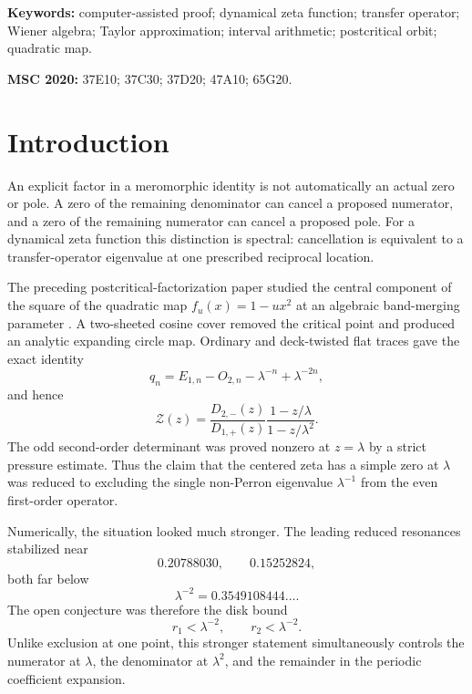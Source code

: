 \documentclass[11pt]{article}
\theoremstyle{definition}
\theoremstyle{remark}
\newcommand{\cZ}{\mathcal Z}
\begin{document}
\noindent\textbf{Keywords:} computer-assisted proof; dynamical zeta function;
transfer operator; Wiener algebra; Taylor approximation; interval arithmetic;
postcritical orbit; quadratic map.

\medskip
\noindent\textbf{MSC 2020:} 37E10; 37C30; 37D20; 47A10; 65G20.

\section{Introduction}
\label{sec:introduction}

An explicit factor in a meromorphic identity is not automatically an actual
zero or pole.  A zero of the remaining denominator can cancel a proposed
numerator, and a zero of the remaining numerator can cancel a proposed pole.
For a dynamical zeta function this distinction is spectral: cancellation is
equivalent to a transfer-operator eigenvalue at one prescribed reciprocal
location.

The preceding postcritical-factorization paper studied the central component
of the square of the quadratic map $f_u(x)=1-u x^2$ at an algebraic
band-merging parameter \citep{WangPostcritical2026}.  A two-sheeted cosine
cover removed the critical point and produced an analytic expanding circle
map.  Ordinary and deck-twisted flat traces gave the exact identity
\begin{equation}\label{eq:prior-trace}
 q_n=E_{1,n}-O_{2,n}-\lambda^{-n}+\lambda^{-2n},
\end{equation}
and hence
\begin{equation}\label{eq:prior-factorization}
 \cZ(z)=\frac{D_{2,-}(z)}{D_{1,+}(z)}
 \frac{1-z/\lambda}{1-z/\lambda^2}.
\end{equation}
The odd second-order determinant was proved nonzero at $z=\lambda$ by a
strict pressure estimate.  Thus the claim that the centered zeta has a simple
zero at $\lambda$ was reduced to excluding the single non-Perron eigenvalue
$\lambda^{-1}$ from the even first-order operator.

Numerically, the situation looked much stronger.  The leading reduced
resonances stabilized near
\begin{equation}\label{eq:numerical-resonances-intro}
 0.20788030,
 \qquad
 0.15252824,
\end{equation}
both far below
\begin{equation}\label{eq:target-intro}
 \lambda^{-2}=0.3549108444\ldots.
\end{equation}
The open conjecture was therefore the disk bound
\begin{equation}\label{eq:conjecture-intro}
 r_1<\lambda^{-2},
 \qquad
 r_2<\lambda^{-2}.
\end{equation}
Unlike exclusion at one point, this stronger statement simultaneously
controls the numerator at $\lambda$, the denominator at $\lambda^2$, and the
remainder in the periodic coefficient expansion.
\end{document}

